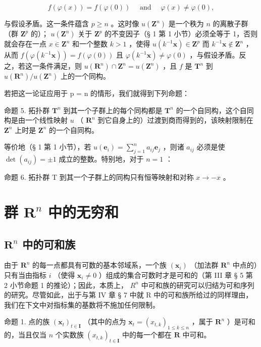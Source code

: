\[
f (\varphi (x)) = f (\varphi (0)) \quad \text { and } \quad \varphi (x) \neq \varphi (0),
\]

与假设矛盾。这一条件蕴含 \(p \geqslant n\) 。这时像 \(u(\mathbf{Z}^n)\) 是一个秩为 \(n\) 的离散子群（群 \(\mathbf{Z}^p\) 的）； \(u(\mathbf{Z}^n)\) 关于 \(\mathbf{Z}^p\) 的不变因子（§ 1 第 1 小节）必须全等于 1，否则就会存在一点 \(x \in \mathbf{Z}^n\) 和一个整数 \(k > 1\) ，使得 \(u(k^{-1}\mathbf{x}) \in \mathbf{Z}^p\) 而 \(k^{-1}\mathbf{x} \notin \mathbf{Z}^n\) ，从而 \(f(\varphi(k^{-1}\mathbf{x})) = f(\varphi(0))\) 且 \(\varphi(k^{-1}\mathbf{x}) \neq \varphi(0)\) ，与假设矛盾。反之，若这一条件满足，则 \(u(\mathbf{R}^n) \cap \mathbf{Z}^n = u(\mathbf{Z}^n)\) ，且 \(f\) 是 \(\mathbf{T}^n\) 到 \(u(\mathbf{R}^n)/u(\mathbf{Z}^n)\) 上的一个同构。

若把这一论证应用于 p = n 的情形，我们就得到下列命题：

命题 5. 拓扑群 \(\mathbf{T}^n\) 到其一个子群上的每个同构都是 \(\mathbf{T}^n\) 的一个自同构，这个自同构是由一个线性映射 \(u\) （ \(\mathbf{R}^n\) 到它自身上的）过渡到商而得到的，该映射限制在 \(\mathbf{Z}^n\) 上时是 \(\mathbf{Z}^n\) 的一个自同构。

等价地（§ 1 第 1 小节），若 \(u(\boldsymbol{e}_i) = \sum_{j=1}^{n} a_{ij} \boldsymbol{e}_j\) ，则诸 \(a_{ij}\) 必须是使 \(\det(a_{ij}) = \pm 1\) 成立的整数。特别地，对于 \(n = 1\) ：

命题 6. 拓扑群 T 到其一个子群上的同构只有恒等映射和对称 \(x \to -x\) 。

\section{\texorpdfstring{群 \(\mathbf{R}^n\) 中的无穷和}{群 R 的 n 次幂中的无穷和}}

\subsection{\texorpdfstring{\(\mathbf{R}^n\) 中的可和族}{R 的 n 次幂中的可和族}}

由于 \(\mathbf{R}^n\) 的每一点都具有可数的基本邻域系，一个族 \((\pmb{x}_i)\) （加法群 \(\mathbf{R}^n\) 中点的）只有当由指标 \(i\) （使得 \(\mathbf{x}_i \neq 0\) ）组成的集合可数时才是可和的（第 III 章 § 5 第 2 小节命题 1 的推论）；因此，本质上， \(R^{n}\) 中可和族的研究可以归结为可和序列的研究。尽管如此，出于与第 IV 章 § 7 中就 R 中的可和族所给过的同样理由，我们在下文中对指标集的基数将不施加任何限制。

命题 1. 点的族 \((\pmb{x}_t)_{t\in \mathbf{I}}\) （其中的点为 \(\pmb{x}_t = (x_{t,k})_{1\leq k\leq n}\) ，属于 \(\mathbf{R}^n\) ）是可和的，当且仅当 \(n\) 个实数族 \((x_{t,k})_{t\in \mathbf{I}}\) 中的每一个都在 \(\mathbf{R}\) 中可和。

